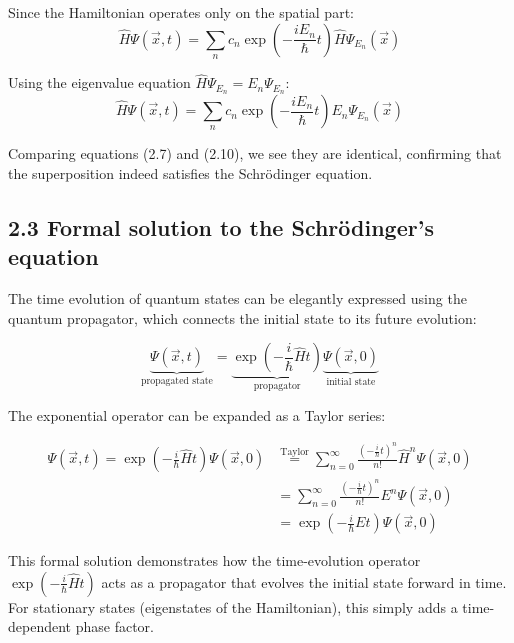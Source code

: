 \documentclass[italian]{HKNdocument}
\begin{document}
Since the Hamiltonian operates only on the spatial part:
\begin{equation*}
\hat{H}\Psi(\vec{x},t) = \sum_n c_n\exp\left(-\frac{iE_n}{\hbar}t\right)\hat{H}\Psi_{E_n}(\vec{x}) \tag{2.9}
\end{equation*}

Using the eigenvalue equation $\hat{H}\Psi_{E_n} = E_n\Psi_{E_n}$:
\begin{equation*}
\hat{H}\Psi(\vec{x},t) = \sum_n c_n\exp\left(-\frac{iE_n}{\hbar}t\right)E_n\Psi_{E_n}(\vec{x}) \tag{2.10}
\end{equation*}

Comparing equations (2.7) and (2.10), we see they are identical, confirming that the superposition indeed satisfies the Schrödinger equation.

\subsection*{2.3 Formal solution to the Schrödinger's equation}

The time evolution of quantum states can be elegantly expressed using the quantum propagator, which connects the initial state to its future evolution:

\begin{equation*}
\underbrace{\Psi(\vec{x},t)}_{\text{propagated state}} = \underbrace{\exp\left(-\frac{i}{\hbar}\hat{H}t\right)}_{\text{propagator}}\underbrace{\Psi(\vec{x},0)}_{\text{initial state}} \tag{2.11}
\end{equation*}

The exponential operator can be expanded as a Taylor series:

\begin{align*}
\Psi(\vec{x},t) = \exp\left(-\frac{i}{\hbar}\hat{H}t\right)\Psi(\vec{x},0) &\stackrel{\text{Taylor}}{=} \sum_{n=0}^{\infty}\frac{\left(-\frac{i}{\hbar}t\right)^n}{n!}\hat{H}^n\Psi(\vec{x},0) \\
&= \sum_{n=0}^{\infty}\frac{\left(-\frac{i}{\hbar}t\right)^n}{n!}E^n\Psi(\vec{x},0) \tag{2.12} \\
&= \exp\left(-\frac{i}{\hbar}Et\right)\Psi(\vec{x},0)
\end{align*}

This formal solution demonstrates how the time-evolution operator $\exp\left(-\frac{i}{\hbar}\hat{H}t\right)$ acts as a propagator that evolves the initial state forward in time. For stationary states (eigenstates of the Hamiltonian), this simply adds a time-dependent phase factor.
\end{document}
